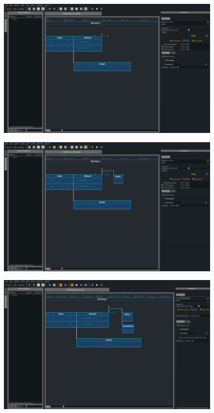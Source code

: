 \documentclass[draft]{beamer}
\begin{document}
\begin{frame} 
    \Large
    \begin{figure}
        \centering
        \includegraphics[width=\textwidth]{images/screens/4.png}
    \end{figure}
\end{frame}
\begin{frame} 
    \Large
    \begin{figure}
        \centering
        \includegraphics[width=\textwidth]{images/screens/5.png}
    \end{figure}
\end{frame}
\begin{frame} 
    \Large
    \begin{figure}
        \centering
        \includegraphics[width=\textwidth]{images/screens/6.png}
    \end{figure}
\end{frame}
\end{document}
